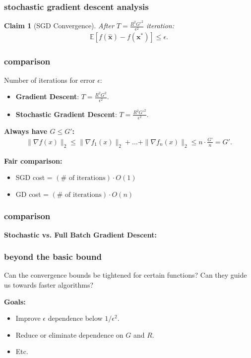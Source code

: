 \documentclass[compress]{beamer}
\newcommand{\bv}[1]{\mathbf{#1}}
\newcommand{\E}{\mathbb{E}}
\newtheorem{claim}[theorem]{Claim}
\begin{document}
\begin{frame}[t]
	\frametitle{stochastic gradient descent analysis}
	\begin{claim}[SGD Convergence]
		After $T = \frac{R^2G'^2}{\epsilon^2}$ iteration:
		\begin{align*}
		\E\left[f(\hat{\bv{x}}) - f(\bv{x}^*)\right] \leq \epsilon.
		\end{align*}
	\end{claim}
\end{frame}

\begin{frame}[t]
	\frametitle{comparison}
	Number of iterations for error $\epsilon$:
	\begin{itemize}
		\item \textbf{Gradient Descent}: $T = \frac{R^2 G^2}{\epsilon^2}$. 
		\item \textbf{Stochastic Gradient Descent}: $T = \frac{R^2 G'^2}{\epsilon^2}$. 
	\end{itemize}

	\textbf{Always have $G \leq G'$:}
	\begin{align*}
		\|\nabla f(x)\|_2 \leq \|\nabla f_1(x)\|_2 + \ldots + \|\nabla f_n(x)\|_2 \leq n\cdot\frac{G'}{n} = G'.
	\end{align*}
	
	\textbf{Fair comparison:}
	\begin{itemize}
		\item SGD cost = $(\# \text{ of iterations})\cdot O(1)$
		\item GD cost = $(\# \text{ of iterations})\cdot O(n)$
	\end{itemize}
\end{frame}

\begin{frame}[t]
	\frametitle{comparison}
	\textbf{Stochastic vs. Full Batch Gradient Descent:}
\end{frame}

\begin{frame}
	\frametitle{beyond the basic bound}
	Can the convergence bounds be tightened for certain functions? Can they guide us towards faster algorithms?
	
	\textbf{Goals:}
	\begin{itemize}
		\item Improve $\epsilon$ dependence below $1/\epsilon^2$.
		\item Reduce or eliminate dependence on $G$ and $R$.
		\item Etc. 
	\end{itemize}
\end{frame}
\end{document}
